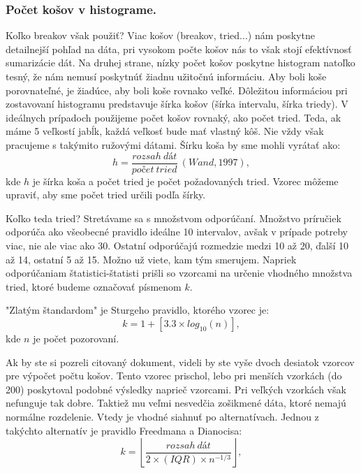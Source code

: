 \begin{Shaded}
\begin{Highlighting}
\end{Highlighting}
\end{Shaded}

\newpage

\subsubsection{Počet košov v histograme.}

Koľko breakov však použiť? Viac košov (breakov, tried...) nám poskytne detailnejší pohľad na dáta, pri vysokom počte košov nás to však stojí efektívnosť sumarizácie dát. Na druhej strane, nízky počet košov poskytne histogram natoľko tesný, že nám nemusí poskytnúť žiadnu užitočnú informáciu. Aby boli koše porovnateľné, je žiadúce, aby boli koše rovnako veľké. Dôležitou informáciou pri zostavovaní histogramu predstavuje šírka košov (šírka intervalu, šírka triedy). V ideálnych prípadoch použijeme počet košov rovnaký, ako počet tried. Teda, ak máme 5 veľkostí jabĺk, každá veľkosť bude mať vlastný kôš. Nie vždy však pracujeme s takýmito ružovými dátami. Šírku koša by sme mohli vyrátať ako:
\begin{equation}
    h = \frac{rozsah \ dát}{počet \ tried} \ (Wand, 1997),
\end{equation}
kde $h$ je šírka koša a počet tried je počet požadovaných tried. Vzorec môžeme upraviť, aby sme počet tried určili podľa šírky.

Koľko teda tried? Stretávame sa s množstvom odporúčaní. Množstvo príručiek odporúča ako všeobecné pravidlo ideálne 10 intervalov, avšak v prípade potreby viac, nie ale viac ako 30. Ostatní odporúčajú rozmedzie medzi 10 až 20, ďalší 10 až 14, ostatní 5 až 15. Možno už viete, kam tým smerujem. Napriek odporúčaniam štatistici-štatisti prišli so vzorcami na určenie vhodného množstva tried, ktoré budeme označovať písmenom $k$.

"Zlatým štandardom" je Sturgeho pravidlo, ktorého vzorec je:
\begin{equation}
    k = 1 + [3.3 \times log_{10}(n)],
\end{equation}
kde $n$ je počet pozorovaní.

Ak by ste si pozreli citovaný dokument, videli by ste vyše dvoch desiatok vzorcov pre výpočet počtu košov. Tento vzorec prischol, lebo pri menších vzorkách (do 200) poskytoval podobné výsledky naprieč vzorcami. Pri veľkých vzorkách však nefunguje tak dobre. Taktiež mu veľmi nesvedčia zošikmené dáta, ktoré nemajú normálne rozdelenie. Vtedy je vhodné siahnuť po alternatívach. Jednou z takýchto alternatív je pravidlo Freedmana a Dianocisa:
\begin{equation}
    k = \left\lfloor \frac{rozsah \ dát}{2 \times (IQR) \times n^{-1/3}} \right \rfloor,
\end{equation}

